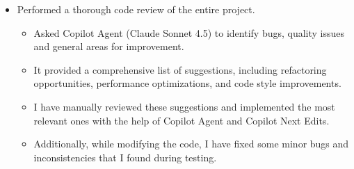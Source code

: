 \documentclass[11pt,a4paper]{article}
\begin{document}
\begin{itemize}
    \item Performed a thorough code review of the entire project.
    \begin{itemize}
        \item Asked Copilot Agent (Claude Sonnet 4.5) to identify bugs, quality issues and general areas for improvement.
        \item It provided a comprehensive list of suggestions, including refactoring opportunities, performance optimizations, and code style improvements.
        \item I have manually reviewed these suggestions and implemented the most relevant ones with the help of Copilot Agent and Copilot Next Edits.
        \item Additionally, while modifying the code, I have fixed some minor bugs and inconsistencies that I found during testing.
    \end{itemize}
\end{itemize}
\end{document}
